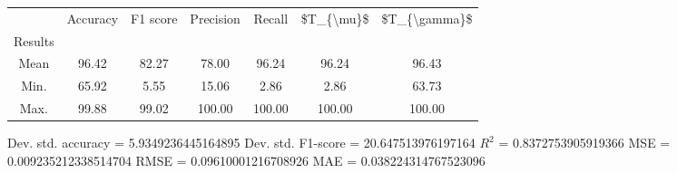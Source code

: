 \begin{tabular}{|c|c|c|c|c|c|c|}
\toprule
{} &  Accuracy &  F1 score &  Precision &  Recall &  \$T\_\{\textbackslash mu\}\$ &  \$T\_\{\textbackslash gamma\}\$ \\
Results &           &           &            &         &            &               \\
\hline
Mean    &     96.42 &     82.27 &      78.00 &   96.24 &      96.24 &         96.43 \\
Min.    &     65.92 &      5.55 &      15.06 &    2.86 &       2.86 &         63.73 \\
Max.    &     99.88 &     99.02 &     100.00 &  100.00 &     100.00 &        100.00 \\
\bottomrule
\end{tabular}

 Dev. std. accuracy = 5.9349236445164895
 Dev. std. F1-score = 20.647513976197164
 $R^2$ = 0.8372753905919366
 MSE = 0.009235212338514704
 RMSE = 0.09610001216708926
 MAE = 0.038224314767523096